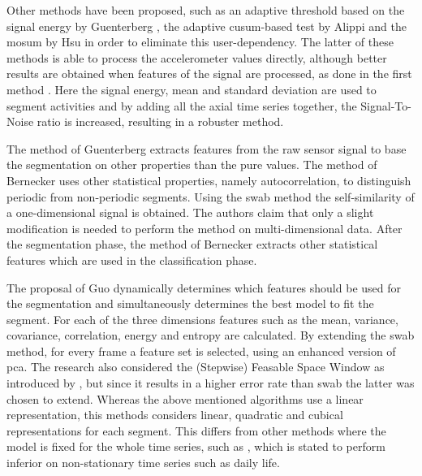 Other methods have been proposed, such as an adaptive threshold based on the signal energy by Guenterberg \etal \cite{guenterberg2009automatic}, the adaptive \gls{cusum}-based test by Alippi \etal \cite{alippi2006adaptive} and the \gls{mosum} by Hsu \cite{hsu2007mosum} in order to eliminate this user-dependency.
The latter of these methods is able to process the accelerometer values directly, although better results are obtained when features of the signal are processed, as done in the first method \cite{guenterberg2009automatic}.
Here the signal energy, mean and standard deviation are used to segment activities and by adding all the axial time series together, the Signal-To-Noise ratio is increased, resulting in a robuster method.

The method of Guenterberg \etal \cite{guenterberg2009automatic} extracts features from the raw sensor signal to base the segmentation on other properties than the pure values.
The method of Bernecker \etal \cite{bernecker2012activity} uses other statistical properties, namely autocorrelation, to distinguish periodic from non-periodic segments.
Using the \gls{swab} method the self-similarity of a one-dimensional signal is obtained.
The authors claim that only a slight modification is needed to perform the method on multi-dimensional data.
After the segmentation phase, the method of Bernecker \etal \cite{bernecker2012activity} extracts other statistical features which are used in the classification phase.

The proposal of Guo \etal \cite{guo2012adaptive} dynamically determines which features should be used for the segmentation and simultaneously determines the best model to fit the segment.
For each of the three dimensions features such as the mean, variance, covariance, correlation, energy and entropy are calculated.
By extending the \gls{swab} method, for every frame a feature set is selected, using an enhanced version of \gls{pca}.
The research also considered the (Stepwise) Feasable Space Window as introduced by \cite{liu2008novel}, but since it results in a higher error rate than \gls{swab} the latter was chosen to extend.
Whereas the above mentioned algorithms use a linear representation, this methods considers linear, quadratic and cubical representations for each segment.
This differs from other methods where the model is fixed for the whole time series, such as \cite{fuchs2010online}, which is stated to perform inferior on non-stationary time series such as daily life.

